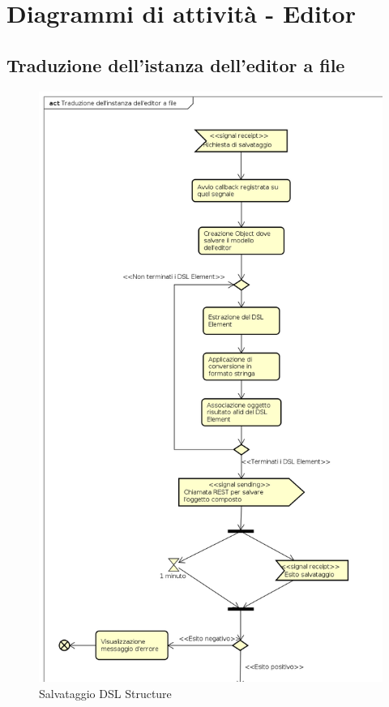 \section{Diagrammi di attività - Editor}
    \subsection{Traduzione dell'istanza dell'editor a file}
    \begin{figure}[H]
      \centering
      \includegraphics[width=.8\textwidth]{res/img/salvataggio.png}
      \caption{Salvataggio DSL Structure}
      \label{fig:salvataggio}
    \end{figure}

